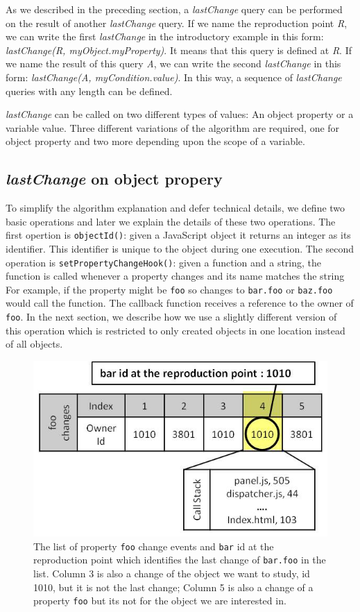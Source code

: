 \documentclass[preprint]{sigplanconf}
\begin{document}
As we described in the preceding section, a \textit{lastChange} query can
be performed on the result of another \textit{lastChange} query. If we
name the reproduction point \textit{R}, we can write the first
\textit{lastChange} in the introductory example in this form:
\textit{lastChange(R, myObject.myProperty)}. It means that this query
is defined at \textit{R}. If we name the result of this query
\textit{A}, we can write the second \textit{lastChange} in this form:
\textit{lastChange(A, myCondition.value)}. In this way, a sequence of
\textit{lastChange} queries with any length can be defined.

\textit{lastChange} can be called on two different types of values: An
object property or a variable value. Three different variations of the
algorithm are required, one for object property and two more depending
upon the scope of a variable.

\subsection{\textit{lastChange} on object propery}
To simplify the algorithm explanation and defer technical details, we
define two basic operations and later we explain the details of these
two operations. The first opertion is \texttt{objectId()}: given a
JavaScript object it returns an integer as its identifier. This
identifier is unique to the object during one execution. The second
operation is \texttt{setPropertyChangeHook()}: given a function and a
string, the function is called whenever a property changes and its
name matches the string For example, if the property might be
\texttt{foo} so changes to \texttt{bar.foo} or \texttt{baz.foo} would
call the function.  The callback function receives a reference to the
owner of \texttt{foo}. In the next section, we describe how we use
a slightly different version of this operation which is restricted 
to only created objects in one location instead of all objects.

\begin{figure}[htp]
\includegraphics[width=.48\textwidth]{6-foo-changes1.jpg}
\caption{The list of property \texttt{foo} change events and
  \texttt{bar} id at the reproduction point which identifies the last
  change of \texttt{bar.foo} in the list. Column 3 is also a change of
  the object we want to study, id 1010, but it is not the last change;
  Column 5 is also a change of a property \texttt{foo} but its not for
  the object we are interested in.}
\label{fig:foo-changes1}
\end{figure}
\end{document}
